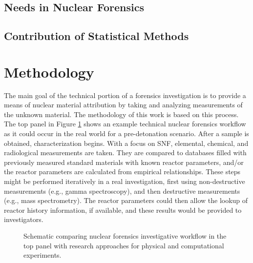 \subsection{Needs in Nuclear Forensics}

\label{sec:nfneeds}

\subsection{Contribution of Statistical Methods}

\label{sec:statscontrib}

\section{Methodology}
\label{sec:methodology}

The main goal of the technical portion of a forensics investigation is to
provide a means of nuclear material attribution by taking and analyzing
measurements of the unknown material.  The methodology of this work is based on
this process. The top panel in Figure \ref{fig:nfworkflows} shows an example
technical nuclear forensics workflow as it could occur in the real world for a
pre-detonation scenario.  After a sample is obtained, characterization begins.
With a focus on \gls{SNF}, elemental, chemical, and radiological measurements
are taken.  They are compared to databases filled with previously measured
standard materials with known reactor parameters, and/or the reactor parameters
are calculated from empirical relationships.  These steps might be performed
iteratively in a real investigation, first using non-destructive measurements
(e.g., gamma spectroscopy), and then destructive measurements (e.g., mass
spectrometry).  The reactor parameters could then allow the lookup of reactor
history information, if available, and these results would be provided to
investigators. 

\begin{figure}[!tbh]
  \caption{Schematic comparing nuclear forensics investigative workflow in the 
           top panel with research approaches for physical and computational 
           experiments.}
  \label{fig:nfworkflows}
\end{figure}

